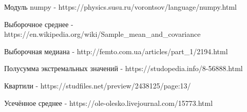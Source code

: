 \documentclass[12pt]{article}
\begin{document}
\newpage

\begin{thebibliography}{}
      Модуль numpy  -  https://physics.susu.ru/vorontsov/language/numpy.html
    
    Выборочное среднее  -  https://en.wikipedia.org/wiki/Sample\_mean\_and\_covariance
    
    Выборочная медиана  -  http://femto.com.ua/articles/part\_1/2194.html
    
    Полусумма экстремальных значений  -  https://studopedia.info/8-56888.html
    
    Квартили  -  https://studfiles.net/preview/2438125/page:13/
    
      Усечённое среднее  -  https://ole-olesko.livejournal.com/15773.html
\end{thebibliography}
\end{document}

